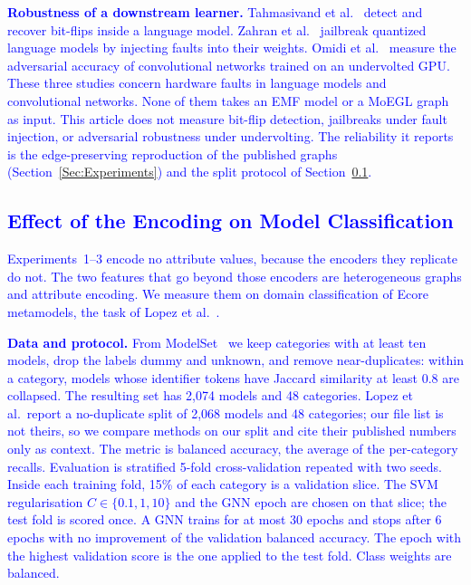 \documentclass[journal,article,submit,moreauthors,technologies]{Definitions/mdpi}
\newcommand{\rev}[1]{\textcolor{blue}{#1}}
\begin{document}
\rev{\textbf{Robustness of a downstream learner.} Tahmasivand et al.~\cite{tahmasivand2025lmfix} detect and recover bit-flips inside a language model. Zahran et al.~\cite{zahran2025jailbreak} jailbreak quantized language models by injecting faults into their weights. Omidi et al.~\cite{omidi2026undervolting} measure the adversarial accuracy of convolutional networks trained on an undervolted GPU. These three studies concern hardware faults in language models and convolutional networks. None of them takes an EMF model or a MoEGL graph as input. This article does not measure bit-flip detection, jailbreaks under fault injection, or adversarial robustness under undervolting. The reliability it reports is the edge-preserving reproduction of the published graphs (Section~\ref{Sec:Experiments}) and the split protocol of Section~\ref{sec:learning}.}


\subsection{\rev{Effect of the Encoding on Model Classification}}\label{sec:learning}

\rev{Experiments~1--3 encode no attribute values, because the encoders they replicate do not. The two features that go beyond those encoders are heterogeneous graphs and attribute encoding. We measure them on domain classification of Ecore metamodels, the task of Lopez et al.~\cite{lopez2022classification}.}

\rev{\textbf{Data and protocol.} From ModelSet~\cite{lopez2022modelset} we keep categories with at least ten models, drop the labels dummy and unknown, and remove near-duplicates: within a category, models whose identifier tokens have Jaccard similarity at least 0.8 are collapsed. The resulting set has 2{,}074 models and 48 categories. Lopez et al.\ report a no-duplicate split of 2{,}068 models and 48 categories; our file list is not theirs, so we compare methods on our split and cite their published numbers only as context. The metric is balanced accuracy, the average of the per-category recalls. Evaluation is stratified 5-fold cross-validation repeated with two seeds. Inside each training fold, 15\% of each category is a validation slice. The SVM regularisation $C\in\{0.1,1,10\}$ and the GNN epoch are chosen on that slice; the test fold is scored once. A GNN trains for at most 30 epochs and stops after 6 epochs with no improvement of the validation balanced accuracy. The epoch with the highest validation score is the one applied to the test fold. Class weights are balanced.}
\end{document}
